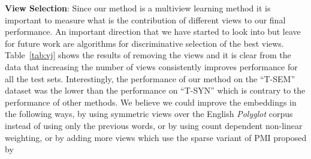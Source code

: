 \documentclass[11pt]{article}
\begin{document}
\textbf{View Selection}:
Since our method is a multiview learning method it is important to
measure what is the contribution of different views to our final
performance. An important direction that we have started to look into but leave for
future work are algorithms for discriminative selection of the best
views. Table~\ref{tab:vj} shows the results 
of removing the views and it is clear from the data that increasing the
number of views consistently improves performance for all the test
sets. Interestingly, the performance of our method on the
``T-SEM'' dataset was the lower than the performance on ``T-SYN''
which is contrary to the performance of other methods. 
We believe we could improve the embeddings in the following ways, by
using symmetric views over the English \textit{Polyglot} corpus
instead of using only the previous words, or by using count dependent
non-linear weighting, or by adding more views which use the sparse 
variant of PMI proposed by \cite{levy2014neural}
\end{document}
